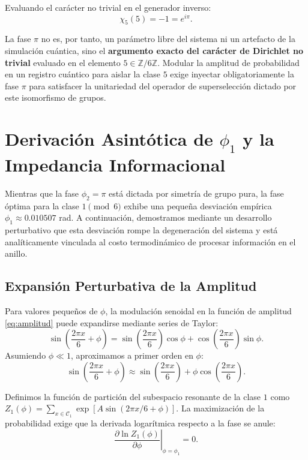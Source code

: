 \documentclass[12pt,a4paper]{article}
\theoremstyle{plain}
\theoremstyle{definition}
\theoremstyle{remark}
\begin{document}
Evaluando el carácter no trivial en el generador inverso:
\begin{equation}
\chi_5(5) = -1 = e^{i\pi}.
\end{equation}

La fase $\pi$ no es, por tanto, un parámetro libre del sistema ni un artefacto de la simulación cuántica, sino el \textbf{argumento exacto del carácter de Dirichlet no trivial} evaluado en el elemento $5 \in \mathbb{Z}/6\mathbb{Z}$. Modular la amplitud de probabilidad en un registro cuántico para aislar la clase $5$ exige inyectar obligatoriamente la fase $\pi$ para satisfacer la unitariedad del operador de superselección dictado por este isomorfismo de grupos.

\section{Derivación Asintótica de $\phi_1$ y la Impedancia Informacional}

Mientras que la fase $\phi_2 = \pi$ está dictada por simetría de grupo pura, la fase óptima para la clase $1 \pmod 6$ exhibe una pequeña desviación empírica $\phi_1 \approx 0.010507$ rad. A continuación, demostramos mediante un desarrollo perturbativo que esta desviación rompe la degeneración del sistema y está analíticamente vinculada al costo termodinámico de procesar información en el anillo.

\subsection{Expansión Perturbativa de la Amplitud}

Para valores pequeños de $\phi$, la modulación senoidal en la función de amplitud \eqref{eq:amplitud} puede expandirse mediante series de Taylor:
\begin{equation}
\sin\left(\frac{2\pi x}{6} + \phi\right) = \sin\left(\frac{2\pi x}{6}\right)\cos\phi + \cos\left(\frac{2\pi x}{6}\right)\sin\phi.
\end{equation}
Asumiendo $\phi \ll 1$, aproximamos a primer orden en $\phi$:
\begin{equation}
\sin\left(\frac{2\pi x}{6} + \phi\right) \approx \sin\left(\frac{2\pi x}{6}\right) + \phi \cos\left(\frac{2\pi x}{6}\right).
\end{equation}

Definimos la función de partición del subespacio resonante de la clase $1$ como $Z_1(\phi) = \sum_{x \in \mathcal{C}_1} \exp\left[A \sin(2\pi x/6 + \phi)\right]$. La maximización de la probabilidad exige que la derivada logarítmica respecto a la fase se anule:
\begin{equation}
\left. \frac{\partial \ln Z_1(\phi)}{\partial \phi} \right|_{\phi = \phi_1} = 0.
\end{equation}
\end{document}
